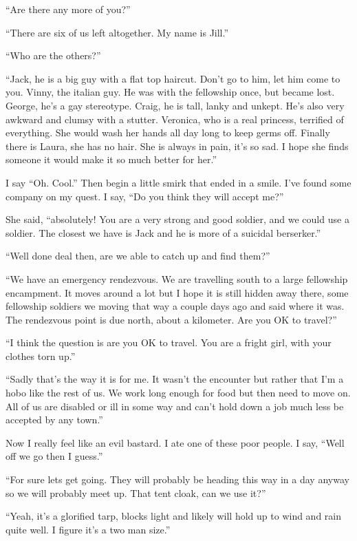``Are there any more of you?''

``There are six of us left altogether. My name is Jill.''

``Who are the others?''

``Jack, he is a big guy with a flat top haircut. Don't go to him, let him come to you. Vinny, the italian guy. He was with the fellowship once, but became lost. George, he's a gay stereotype. Craig, he is tall, lanky and unkept. He's also very awkward and clumsy with a stutter. Veronica, who is a real princess, terrified of everything. She would wash her hands all day long to keep germs off. Finally there is Laura, she has no hair. She is always in pain, it's so sad. I hope she finds someone it would make it so much better for her.''

I say ``Oh. Cool.'' Then begin a little smirk that ended in a smile. I've found some company on my quest. I say, ``Do you think they will accept me?''

She said, ``absolutely! You are a very strong and good soldier, and we could use a soldier. The closest we have is Jack and he is more of a suicidal berserker.''

``Well done deal then, are we able to catch up and find them?''

``We have an emergency rendezvous. We are travelling south to a large fellowship encampment. It moves around a lot but I hope it is still hidden away there, some fellowship soldiers we moving that way a couple days ago and said where it was. The rendezvous point is due north, about a kilometer. Are you OK to travel?''

``I think the question is are you OK to travel. You are a fright girl, with your clothes torn up.''

``Sadly that's the way it is for me. It wasn't the encounter but rather that I'm a hobo like the rest of us. We work long enough for food but then need to move on. All of us are disabled or ill in some way and can't hold down a job much less be accepted by any town.''

Now I really feel like an evil bastard. I ate one of these poor people. I say, ``Well off we go then I guess.''

``For sure lets get going. They will probably be heading this way in a day anyway so we will probably meet up. That tent cloak, can we use it?''

``Yeah, it's a glorified tarp, blocks light and likely will hold up to wind and rain quite well. I figure it's a two man size.''

